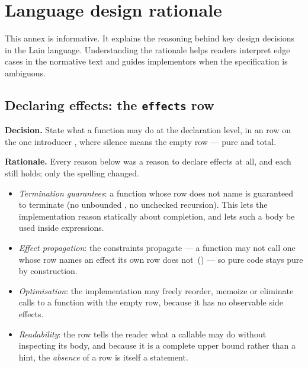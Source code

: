 \chapter{Language design rationale}
\label{annex:C-rationale}

\pnum
This annex is informative.  It explains the reasoning behind key design
decisions in the Lain language.  Understanding the rationale helps readers
interpret edge cases in the normative text and guides implementors when
the specification is ambiguous.

\section{Declaring effects: the \texttt{effects} row}
\label{sec:rationale.func-proc}

\pnum
\textbf{Decision.}  State what a function may do at the declaration level, in an
 row on the one introducer , where silence means the
empty row --- pure and total.

\pnum
\textbf{Rationale.}  Every reason below was a reason to declare effects at all,
and each still holds; only the spelling changed.
\begin{itemize}
  \item \textit{Termination guarantees}: a function whose row does not name
         is guaranteed to terminate (no unbounded , no
        unchecked recursion).  This lets the implementation reason statically
        about completion, and lets such a body be used inside 
        expressions.
  \item \textit{Effect propagation}: the constraints propagate --- a function may
        not call one whose row names an effect its own row does
        not~() --- so pure code stays pure by construction.
  \item \textit{Optimisation}: the implementation may freely reorder, memoize or
        eliminate calls to a function with the empty row, because it has no
        observable side effects.
  \item \textit{Readability}: the row tells the reader what a callable may do
        without inspecting its body, and because it is a complete upper bound
        rather than a hint, the \emph{absence} of a row is itself a statement.
\end{itemize}

